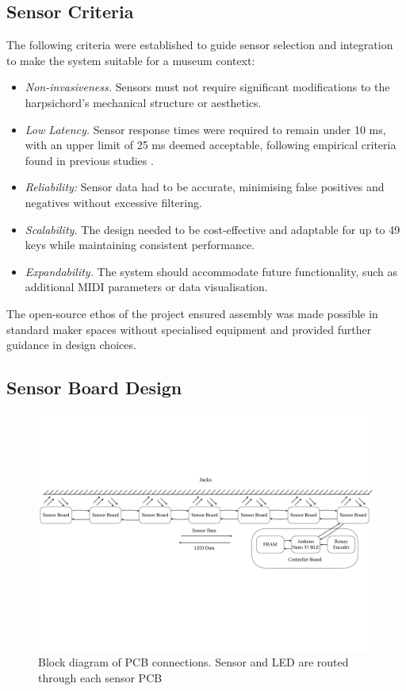 \subsection{Sensor Criteria}\label{sensor-criteria}

The following criteria were established to guide sensor selection and integration to make the system suitable for a museum context:

\begin{itemize}
    \item \emph{Non-invasiveness.} Sensors must not require significant modifications to the harpsichord's mechanical structure or aesthetics.
    \item \emph{Low Latency.} Sensor response times were required to remain under 10 ms, with an upper limit of 25 ms deemed acceptable, following empirical criteria found in previous studies \cite{Jack2016}.
    \item \emph{Reliability:} Sensor data had to be accurate, minimising false positives and negatives without excessive filtering.
    \item \emph{Scalability.} The design needed to be cost-effective and adaptable for up to 49 keys while maintaining consistent performance.
    \item \emph{Expandability.} The system should accommodate future functionality, such as additional MIDI parameters or data visualisation.
\end{itemize}

The open-source ethos of the project ensured assembly was made possible in standard maker spaces without specialised equipment and provided further guidance in design choices.  

\subsection{Sensor Board Design}\label{sensor-board}

\begin{figure}
    \centering
    \includegraphics[width=\linewidth]{src/images/block-diagram.pdf}
    \caption{Block diagram of PCB connections. Sensor and LED are routed through each sensor PCB}
    \label{fig:system-block-diagram}
\end{figure}

